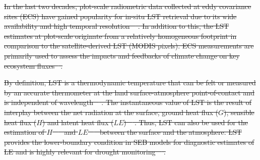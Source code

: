 \documentclass[fleqn,10pt]{wlscirep}
\providecommand{\DIFdeltex}[1]{{\protect\color{red}\sout{#1}}}                      %
\providecommand{\DIFdelbegin}{} %
\providecommand{\DIFdel}[1]{\texorpdfstring{\DIFdeltex{#1}}{}} %
\begin{document}
 \DIFdelbegin \DIFdel{In the last two decades, plot-scale radiometric data collected at eddy covariance sites (ECS) have gained popularity for in-situ LST retrieval due to its wide availability and high temporal resolution \mbox{%
\cite{stoy2013data,cullen2007energy}}\hspace{0pt}%
. In addition to this, the LST estimates at plot-scale originate from a relatively homogeneous footprint in comparison to the satellite-derived LST (MODIS pixels). ECS measurements are primarily used to assess the impacts and feedbacks of climate change on key ecosystem fluxes\mbox{%
\cite{baldocchi2001fluxnet}}\hspace{0pt}%
.
   }%

\DIFdel{By definition, LST is a thermodynamic temperature that can be felt or measured by an accurate thermometer at the land surface-atmosphere point-of-contact and is independent of wavelength \mbox{%
\cite{guillevic2017land}}\hspace{0pt}%
. The instantaneous value of LST is the result of interplay between the net radiation at the surface, ground heat flux ($G$), sensible heat flux ($H$) and latent heat flux ($LE$) \mbox{%
\cite{wang2013global}}\hspace{0pt}%
. Thus, LST can also be used for the estimation of $H$ \mbox{%
\cite{sun1995relationship} }\hspace{0pt}%
and $LE$ \mbox{%
\cite{jacob2001comprehensive} }\hspace{0pt}%
between the surface and the atmosphere. LST provides the lower-boundary condition in SEB models for diagnostic estimates of LE  and is highly relevant for drought monitoring \mbox{%
\cite{trebs2021role,mallick2016canopy,mallick2015reintroducing}}\hspace{0pt}%
.
  }%
\end{document}
